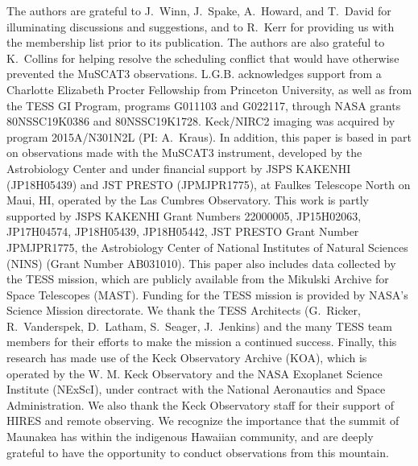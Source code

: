 \documentclass[12pt,modern,twocolumn,tighten]{aastex63}
\begin{document}
The authors are grateful to J{.}~Winn, J{.}~Spake, A{.}~Howard, and
T{.}~David for illuminating discussions and suggestions, and to
R{.}~Kerr for providing us with the \citet{Kerr2021} membership list
prior to its publication.  The authors are also grateful to
K{.}~Collins for helping resolve the scheduling conflict that would
have otherwise prevented the MuSCAT3 observations.
%
L.G.B{.} acknowledges support from a Charlotte Elizabeth Procter
Fellowship from Princeton University, as well as from the TESS GI
Program, programs G011103 and G022117, through NASA grants
80NSSC19K0386 and 80NSSC19K1728.
%
%
Keck/NIRC2 imaging was acquired by program 2015A/N301N2L
(PI: A.~Kraus). %
%
In addition, this paper is based in part on observations made with the
MuSCAT3 instrument, developed by the Astrobiology Center and under
financial support by JSPS KAKENHI (JP18H05439) and JST PRESTO
(JPMJPR1775), at Faulkes Telescope North on Maui, HI, operated by the
Las Cumbres Observatory.
%
This work is partly supported by JSPS KAKENHI Grant Numbers 22000005,
JP15H02063, JP17H04574, JP18H05439, JP18H05442, JST PRESTO Grant
Number JPMJPR1775, the Astrobiology Center of National Institutes of
Natural Sciences (NINS) (Grant Number AB031010).
%
%
This paper also includes data collected by the TESS mission, which are
publicly available from the Mikulski Archive for Space Telescopes
(MAST).
%
Funding for the TESS mission is provided by NASA's Science Mission
directorate.
%
We thank the TESS Architects (G.~Ricker, R.~Vanderspek, D.~Latham,
S.~Seager, J.~Jenkins) and the many TESS team members for their
efforts to make the mission a continued success.
%
%
%
%
Finally, this research has made use of the Keck Observatory Archive (KOA),
which is operated by the W. M. Keck Observatory and the NASA Exoplanet
Science Institute (NExScI), under contract with the National
Aeronautics and Space Administration.  We also thank the Keck
Observatory staff for their support of HIRES and remote observing.  We
recognize the importance that the summit of Maunakea has within the
indigenous Hawaiian community, and are deeply grateful to have the
opportunity to conduct observations from this mountain.
%
%
\end{document}
